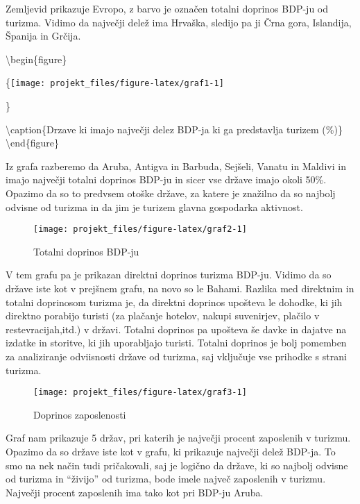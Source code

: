 \documentclass[]{article}
\begin{document}
Zemljevid prikazuje Evropo, z barvo je označen totalni doprinos BDP-ju
od turizma. Vidimo da največji delež ima Hrvaška, sledijo pa ji Črna
gora, Islandija, Španija in Grčija.

\textbackslash{}begin\{figure\}

\{\centering \texttt{[image: projekt\_files/figure-latex/graf1-1]}

\}

\textbackslash{}caption\{Drzave ki imajo največji delez BDP-ja ki ga
predstavlja turizem (\%)\}\label{fig:graf1}
\textbackslash{}end\{figure\}

Iz grafa razberemo da Aruba, Antigva in Barbuda, Sejšeli, Vanatu in
Maldivi in imajo največji totalni doprinos BDP-ju in sicer vse države
imajo okoli 50\%. Opazimo da so to predvsem otoške države, za katere je
znažilno da so najbolj odvisne od turizma in da jim je turizem glavna
gospodarka aktivnost.

\begin{figure}

{\centering \texttt{[image: projekt\_files/figure-latex/graf2-1]} 

}

\caption{Totalni doprinos BDP-ju}\label{fig:graf2}
\end{figure}

V tem grafu pa je prikazan direktni doprinos turizma BDP-ju. Vidimo da
so države iste kot v prejšnem grafu, na novo so le Bahami. Razlika med
direktnim in totalni doprinosom turizma je, da direktni doprinos
upošteva le dohodke, ki jih direktno porabijo turisti (za plačanje
hotelov, nakupi suvenirjev, plačilo v restevracijah,itd.) v državi.
Totalni doprinos pa upošteva še davke in dajatve na izdatke in storitve,
ki jih uporabljajo turisti. Totalni doprinos je bolj pomemben za
analiziranje odviisnosti države od turizma, saj vključuje vse prihodke s
strani turizma.

\begin{figure}

{\centering \texttt{[image: projekt\_files/figure-latex/graf3-1]} 

}

\caption{Doprinos zaposlenosti}\label{fig:graf3}
\end{figure}

Graf nam prikazuje 5 držav, pri katerih je največji procent zaposlenih v
turizmu. Opazimo da so države iste kot v grafu, ki prikazuje največji
delež BDP-ja. To smo na nek način tudi pričakovali, saj je logično da
države, ki so najbolj odvisne od turizma in ``živijo'' od turizma, bode
imele največ zaposlenih v turizmu. Največji procent zaposlenih ima tako
kot pri BDP-ju Aruba.
\end{document}
